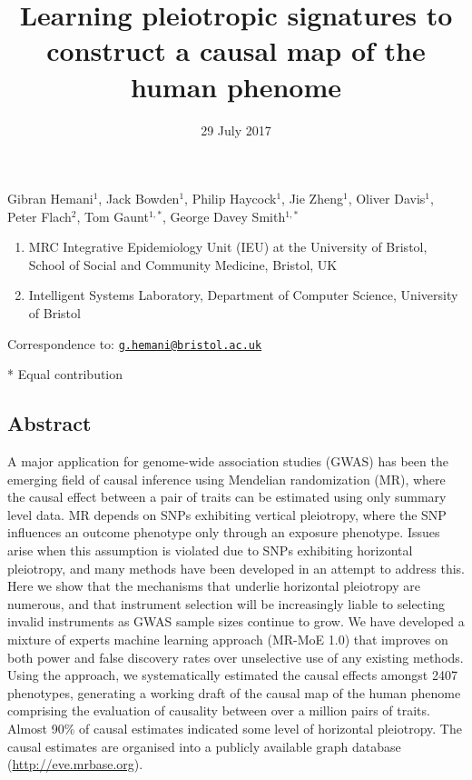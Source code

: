 \documentclass[]{article}
\title{Learning pleiotropic signatures to construct a causal map of the human
phenome}
\author{}
\date{29 July 2017}
\providecommand{\tightlist}{%
  \setlength{\itemsep}{0pt}\setlength{\parskip}{0pt}}
\begin{document}
\maketitle

Gibran Hemani\(^1\), Jack Bowden\(^1\), Philip Haycock\(^1\), Jie
Zheng\(^1\), Oliver Davis\(^1\), Peter Flach\(^2\), Tom Gaunt\(^{1,*}\),
George Davey Smith\(^{1,*}\)

\begin{enumerate}
\def\labelenumi{\arabic{enumi}.}
\tightlist
\item
  MRC Integrative Epidemiology Unit (IEU) at the University of Bristol,
  School of Social and Community Medicine, Bristol, UK
\item
  Intelligent Systems Laboratory, Department of Computer Science,
  University of Bristol
\end{enumerate}

Correspondence to:
\href{mailto:g.hemani@bristol.ac.uk}{\nolinkurl{g.hemani@bristol.ac.uk}}

* Equal contribution

\subsection{Abstract}\label{abstract}

A major application for genome-wide association studies (GWAS) has been
the emerging field of causal inference using Mendelian randomization
(MR), where the causal effect between a pair of traits can be estimated
using only summary level data. MR depends on SNPs exhibiting vertical
pleiotropy, where the SNP influences an outcome phenotype only through
an exposure phenotype. Issues arise when this assumption is violated due
to SNPs exhibiting horizontal pleiotropy, and many methods have been
developed in an attempt to address this. Here we show that the
mechanisms that underlie horizontal pleiotropy are numerous, and that
instrument selection will be increasingly liable to selecting invalid
instruments as GWAS sample sizes continue to grow. We have developed a
mixture of experts machine learning approach (MR-MoE 1.0) that improves
on both power and false discovery rates over unselective use of any
existing methods. Using the approach, we systematically estimated the
causal effects amongst 2407 phenotypes, generating a working draft of
the causal map of the human phenome comprising the evaluation of
causality between over a million pairs of traits. Almost 90\% of causal
estimates indicated some level of horizontal pleiotropy. The causal
estimates are organised into a publicly available graph database
(\url{http://eve.mrbase.org}).
\end{document}
